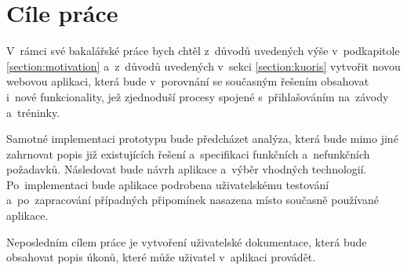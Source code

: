 \section{Cíle práce}
V~rámci své bakalářské práce bych chtěl z~důvodů uvedených výše v~podkapitole \ref{section:motivation} a~z~důvodů uvedených v~sekci \ref{section:kuoris} vytvořit novou webovou aplikaci, která bude v~porovnání se současným řešením obsahovat i~nové funkcionality, jež zjednoduší procesy spojené s~přihlašováním na~závody a~tréninky.
 
Samotné implementaci prototypu bude předcházet analýza, která bude mimo jiné zahrnovat popis již existujících řešení a~specifikaci funkčních a~nefunkčních požadavků. Následovat bude návrh aplikace a~výběr vhodných technologií. Po~implementaci bude aplikace podrobena uživatelskému testování a~po~zapracování případných připomínek nasazena místo současně používané aplikace.

Neposledním cílem práce je vytvoření uživatelské dokumentace, která bude obsahovat popis úkonů, které může uživatel v~aplikaci provádět.
